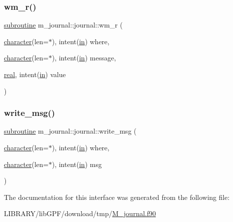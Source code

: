 \mbox{\label{interfacem__journal_1_1journal_a09564db3ada040acc04f1fd79a9eb731}} 
\subsubsection{\texorpdfstring{wm\+\_\+r()}{wm\_r()}}
{\footnotesize\ttfamily \hyperlink{M__stopwatch_83_8txt_acfbcff50169d691ff02d4a123ed70482}{subroutine} m\+\_\+journal\+::journal\+::wm\+\_\+r (\begin{DoxyParamCaption}\item[{\hyperlink{option__stopwatch_83_8txt_abd4b21fbbd175834027b5224bfe97e66}{character}(len=$\ast$), intent(\hyperlink{M__journal_83_8txt_afce72651d1eed785a2132bee863b2f38}{in})}]{where,  }\item[{\hyperlink{option__stopwatch_83_8txt_abd4b21fbbd175834027b5224bfe97e66}{character}(len=$\ast$), intent(\hyperlink{M__journal_83_8txt_afce72651d1eed785a2132bee863b2f38}{in})}]{message,  }\item[{\hyperlink{read__watch_83_8txt_abdb62bde002f38ef75f810d3a905a823}{real}, intent(\hyperlink{M__journal_83_8txt_afce72651d1eed785a2132bee863b2f38}{in})}]{value }\end{DoxyParamCaption})\hspace{0.3cm}{\ttfamily [private]}}

\mbox{\label{interfacem__journal_1_1journal_aa275808b96de510b44676e53faba3566}} 
\subsubsection{\texorpdfstring{write\+\_\+msg()}{write\_msg()}}
{\footnotesize\ttfamily \hyperlink{M__stopwatch_83_8txt_acfbcff50169d691ff02d4a123ed70482}{subroutine} m\+\_\+journal\+::journal\+::write\+\_\+msg (\begin{DoxyParamCaption}\item[{\hyperlink{option__stopwatch_83_8txt_abd4b21fbbd175834027b5224bfe97e66}{character}(len=$\ast$), intent(\hyperlink{M__journal_83_8txt_afce72651d1eed785a2132bee863b2f38}{in})}]{where,  }\item[{\hyperlink{option__stopwatch_83_8txt_abd4b21fbbd175834027b5224bfe97e66}{character}(len=$\ast$), intent(\hyperlink{M__journal_83_8txt_afce72651d1eed785a2132bee863b2f38}{in})}]{msg }\end{DoxyParamCaption})\hspace{0.3cm}{\ttfamily [private]}}



The documentation for this interface was generated from the following file\+:\begin{DoxyCompactItemize}
\item 
L\+I\+B\+R\+A\+R\+Y/lib\+G\+P\+F/download/tmp/\hyperlink{M__journal_8f90}{M\+\_\+journal.\+f90}\end{DoxyCompactItemize}
